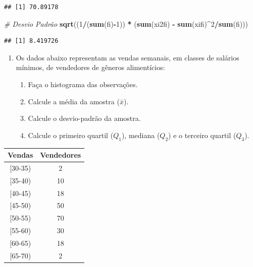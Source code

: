 \documentclass[]{article}
\newenvironment{Shaded}{\begin{snugshade}}{\end{snugshade}}
\newcommand{\KeywordTok}[1]{\textcolor[rgb]{0.13,0.29,0.53}{\textbf{#1}}}
\newcommand{\DecValTok}[1]{\textcolor[rgb]{0.00,0.00,0.81}{#1}}
\newcommand{\StringTok}[1]{\textcolor[rgb]{0.31,0.60,0.02}{#1}}
\newcommand{\CommentTok}[1]{\textcolor[rgb]{0.56,0.35,0.01}{\textit{#1}}}
\newcommand{\OperatorTok}[1]{\textcolor[rgb]{0.81,0.36,0.00}{\textbf{#1}}}
\newcommand{\NormalTok}[1]{#1}
\providecommand{\tightlist}{%
  \setlength{\itemsep}{0pt}\setlength{\parskip}{0pt}}
\begin{document}
\begin{verbatim}
## [1] 70.89178
\end{verbatim}

\begin{Shaded}
\begin{Highlighting}[]
\CommentTok{# Desvio Padrão}
\KeywordTok{sqrt}\NormalTok{((}\DecValTok{1}\OperatorTok{/}\NormalTok{(}\KeywordTok{sum}\NormalTok{(fi)}\OperatorTok{-}\DecValTok{1}\NormalTok{)) }\OperatorTok{*}\StringTok{ }\NormalTok{(}\KeywordTok{sum}\NormalTok{(xi2fi) }\OperatorTok{-}\StringTok{ }\KeywordTok{sum}\NormalTok{(xifi)}\OperatorTok{^}\DecValTok{2}\OperatorTok{/}\KeywordTok{sum}\NormalTok{(fi)))}
\end{Highlighting}
\end{Shaded}

\begin{verbatim}
## [1] 8.419726
\end{verbatim}

\begin{enumerate}
\def\labelenumi{\arabic{enumi}.}
\setcounter{enumi}{4}
\tightlist
\item
  Os dados abaixo representam as vendas semanais, em classes de salários
  mínimos, de vendedores de gêneros alimentícios:

  \begin{enumerate}
  \def\labelenumii{(\alph{enumii})}
  \tightlist
  \item
    Faça o histograma das observações.
  \item
    Calcule a média da amostra (\(\bar x\)).
  \item
    Calcule o desvio-padrão da amostra.
  \item
    Calcule o primeiro quartil (\(Q_1\)), mediana (\(Q_2\)) e o terceiro
    quartil (\(Q_3\)).
  \end{enumerate}
\end{enumerate}

\begin{table}[H]
\centering
\begin{tabular}{cc}
\hline
Vendas    & Vendedores \\ \hline
{[}30-35) & 2          \\
{[}35-40) & 10         \\
{[}40-45) & 18         \\
{[}45-50) & 50         \\
{[}50-55) & 70         \\
{[}55-60) & 30         \\
{[}60-65) & 18         \\
{[}65-70) & 2          \\ \hline
\end{tabular}
\end{table}
\end{document}
